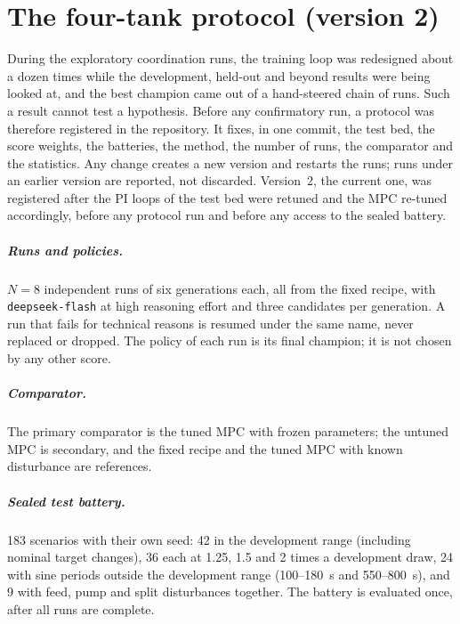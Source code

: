 \chapter{The four-tank protocol (version 2)}
\label{app:four-tank-protocol}
During the exploratory coordination runs, the training loop was redesigned
about a dozen times while the development, held-out and beyond results were
being looked at, and the best champion came out of a hand-steered chain of
runs. Such a result cannot test a hypothesis. Before any confirmatory run,
a protocol was therefore registered in the repository. It fixes, in one
commit, the test bed, the score weights, the batteries, the method, the
number of runs, the comparator and the statistics. Any change creates a new
version and restarts the runs; runs under an earlier version are reported,
not discarded. Version~2, the current one, was registered after the PI loops
of the test bed were retuned and the MPC re-tuned accordingly, before any
protocol run and before any access to the sealed battery.

\paragraph{Runs and policies.} $N = 8$ independent runs of six generations
each, all from the fixed recipe, with \texttt{deepseek-flash} at high
reasoning effort and three candidates per generation. A run that fails for
technical reasons is resumed under the same name, never replaced or dropped.
The policy of each run is its final champion; it is not chosen by any other
score.

\paragraph{Comparator.} The primary comparator is the tuned MPC with frozen
parameters; the untuned MPC is secondary, and the fixed recipe and the tuned
MPC with known disturbance are references.

\paragraph{Sealed test battery.} 183 scenarios with their own seed: 42 in the
development range (including nominal target changes), 36 each at 1.25, 1.5
and 2 times a development draw, 24 with sine periods outside the development
range (100--180~s and 550--800~s), and 9 with feed, pump and split
disturbances together. The battery is evaluated once, after all runs are
complete.

